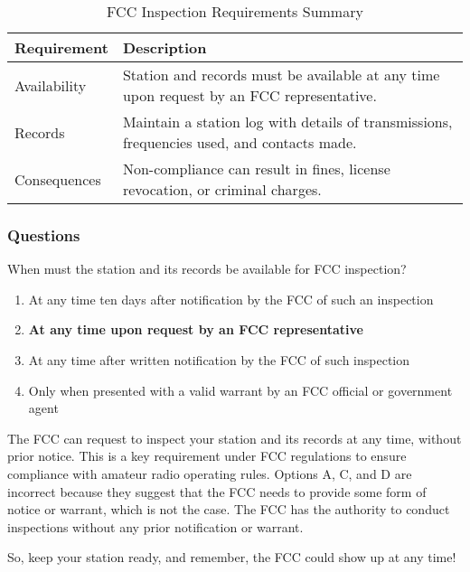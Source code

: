\begin{table}[h]
    \footnotesize
    \centering
    \begin{tabular}{|l|l|}
        \hline
        \textbf{Requirement} & \textbf{Description} \\
        \hline
        Availability & Station and records must be available at any time upon request by an FCC representative. \\
        \hline
        Records & Maintain a station log with details of transmissions, frequencies used, and contacts made. \\
        \hline
        Consequences & Non-compliance can result in fines, license revocation, or criminal charges. \\
        \hline
    \end{tabular}
    \caption{FCC Inspection Requirements Summary}
    \label{tab:fcc-inspection-summary}
\end{table}

\subsubsection{Questions}

\begin{tcolorbox}[colback=gray!10!white,colframe=black!75!black,title={T1F01}]
    When must the station and its records be available for FCC inspection?
    \begin{enumerate}[label=\Alph*),noitemsep]
        \item At any time ten days after notification by the FCC of such an inspection
        \item \textbf{At any time upon request by an FCC representative}
        \item At any time after written notification by the FCC of such inspection
        \item Only when presented with a valid warrant by an FCC official or government agent
    \end{enumerate}
\end{tcolorbox}

The FCC can request to inspect your station and its records at any time, without prior notice. This is a key requirement under FCC regulations to ensure compliance with amateur radio operating rules. Options A, C, and D are incorrect because they suggest that the FCC needs to provide some form of notice or warrant, which is not the case. The FCC has the authority to conduct inspections without any prior notification or warrant.

So, keep your station ready, and remember, the FCC could show up at any time!
